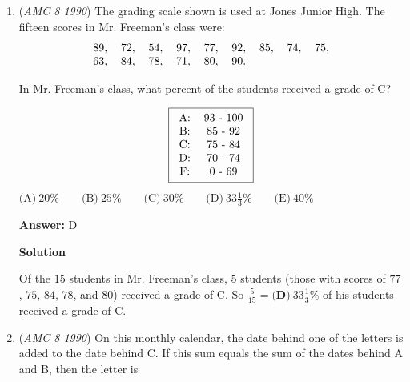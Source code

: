 \begin{enumerate}
 $\text{(A)}\ \text{45 dollars} \qquad \text{(B)}\ \text{52 dollars} \qquad \text{(C)}\ \text{54 dollars} \qquad \text{(D)}\ \text{66 dollars} \qquad \text{(E)}\ \text{68 dollars}$

 \textbf{Answer: }D



\textbf{Solution}

The sale price is $0.75 \cdot \$80 = \$60$, so the total price is $1.1 \cdot \$60 = \boxed{\textbf{(D)}\ \$66}$.

 


	\item (\textit{AMC 8 1990}) The grading scale shown is used at Jones Junior High.  The fifteen scores in Mr. Freeman's class were: 
 \[\begin{tabular}[t]{lllllllll} 89, & 72, & 54, & 97, & 77, & 92, & 85, & 74, & 75, \\ 63, & 84, & 78, & 71, & 80, & 90. & & & \\ \end{tabular}\]


 In Mr. Freeman's class, what percent of the students received a grade of C?


 
 \[\boxed{\begin{tabular}[t]{cc} A: & 93 - 100 \\ B: & 85 - 92 \\ C: & 75 - 84 \\ D: & 70 - 74 \\ F: & 0 - 69  \end{tabular}}\]
$\text{(A)}\ 20\% \qquad \text{(B)}\ 25\% \qquad \text{(C)}\ 30\% \qquad \text{(D)}\ 33\frac{1}{3}\% \qquad \text{(E)}\ 40\%$

 \textbf{Answer: }D



\textbf{Solution}

Of the $15$ students in Mr. Freeman's class, $5$ students (those with scores of $77$, $75$, $84$, $78$, and $80$) received a grade of C.  So $\frac{5}{15}=\boxed{\textbf{(D)}\ 33\frac{1}{3}\%}$ of his students received a grade of C.

 


	\item (\textit{AMC 8 1990}) On this monthly calendar, the date behind one of the letters is added to the date behind $\text{C}$.  If this sum equals the sum of the dates behind $\text{A}$ and $\text{B}$, then the letter is



\end{enumerate}
